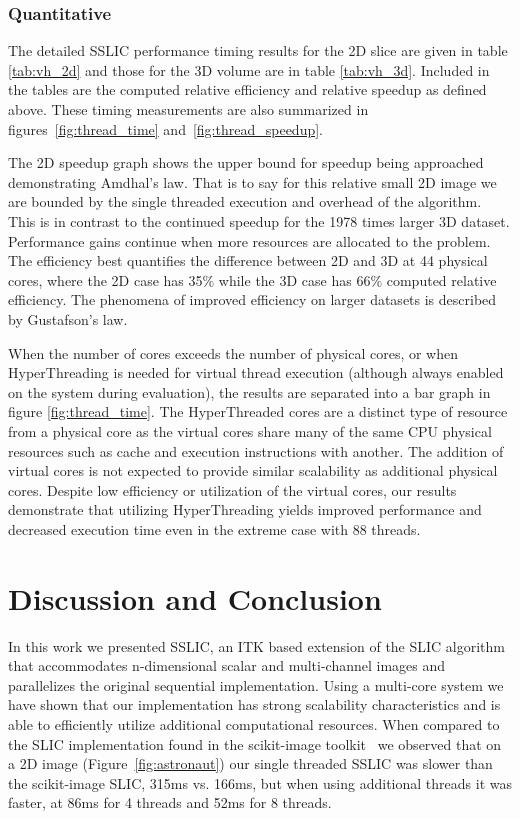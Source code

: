 \documentclass{InsightArticle}
\begin{document}
\subsubsection{Quantitative}

The detailed SSLIC performance timing results for the 2D
slice are given in table \ref{tab:vh_2d} and those for the 3D volume are in table
\ref{tab:vh_3d}. Included in the tables are the
computed relative efficiency and relative speedup as defined above.
These timing measurements are also summarized  in
figures~\ref{fig:thread_time} and~\ref{fig:thread_speedup}.

The 2D speedup graph shows the upper bound for speedup being approached
demonstrating Amdhal's law. That is to say for this relative small 2D image we
are bounded by the single threaded execution and overhead of the algorithm. This
is in contrast to the continued speedup for the 1978 times larger 3D dataset.
Performance gains continue when more resources are allocated to the problem. The
efficiency best quantifies the difference between 2D and 3D at 44 physical
cores, where the 2D case has 35\% while the 3D case has 66\% computed relative
efficiency. The phenomena of improved efficiency on larger datasets is described
by Gustafson's law\cite{Gustafson:1988}.

When the number of cores exceeds the number of physical cores, or when
HyperThreading is needed for virtual thread execution (although always enabled
on the system during evaluation), the results are separated into a bar graph in
figure \ref{fig:thread_time}. The HyperThreaded cores are a distinct type of
resource from a physical core as the virtual cores share many of the same CPU
physical resources such as cache and execution instructions with another. The
addition of virtual cores is not expected to provide  similar scalability
as additional physical cores. Despite low efficiency or utilization of the
virtual cores, our results demonstrate that utilizing HyperThreading yields
improved performance and decreased execution time even in the extreme case with
88 threads.



\section{Discussion and Conclusion}

In this work we presented SSLIC, an ITK based extension of the SLIC algorithm
that accommodates n-dimensional scalar and multi-channel images and parallelizes
the original sequential implementation. Using a multi-core system we have shown
that our implementation has strong scalability characteristics and is able to
efficiently utilize additional computational resources. When compared to the
SLIC implementation found in the scikit-image toolkit~\cite{scikit-image} we
observed that on a 2D image (Figure~\ref{fig:astronaut}) our single threaded
SSLIC was slower than the scikit-image SLIC, 315ms vs. 166ms, but when using
additional threads it was faster, at 86ms for 4 threads and 52ms for 8 threads.
\end{document}
